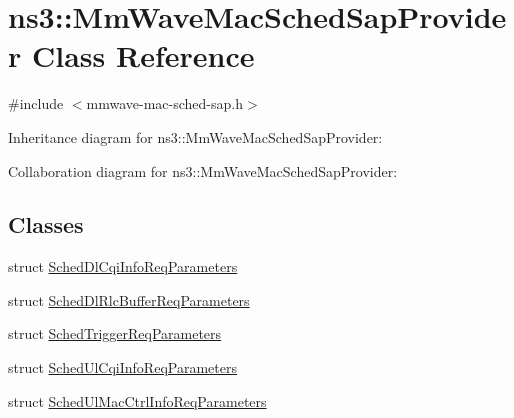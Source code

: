\hypertarget{classns3_1_1MmWaveMacSchedSapProvider}{}\section{ns3\+:\+:Mm\+Wave\+Mac\+Sched\+Sap\+Provider Class Reference}
\label{classns3_1_1MmWaveMacSchedSapProvider}


{\ttfamily \#include $<$mmwave-\/mac-\/sched-\/sap.\+h$>$}



Inheritance diagram for ns3\+:\+:Mm\+Wave\+Mac\+Sched\+Sap\+Provider\+:


Collaboration diagram for ns3\+:\+:Mm\+Wave\+Mac\+Sched\+Sap\+Provider\+:
\subsection*{Classes}
\begin{DoxyCompactItemize}
\item 
struct \hyperlink{structns3_1_1MmWaveMacSchedSapProvider_1_1SchedDlCqiInfoReqParameters}{Sched\+Dl\+Cqi\+Info\+Req\+Parameters}
\item 
struct \hyperlink{structns3_1_1MmWaveMacSchedSapProvider_1_1SchedDlRlcBufferReqParameters}{Sched\+Dl\+Rlc\+Buffer\+Req\+Parameters}
\item 
struct \hyperlink{structns3_1_1MmWaveMacSchedSapProvider_1_1SchedTriggerReqParameters}{Sched\+Trigger\+Req\+Parameters}
\item 
struct \hyperlink{structns3_1_1MmWaveMacSchedSapProvider_1_1SchedUlCqiInfoReqParameters}{Sched\+Ul\+Cqi\+Info\+Req\+Parameters}
\item 
struct \hyperlink{structns3_1_1MmWaveMacSchedSapProvider_1_1SchedUlMacCtrlInfoReqParameters}{Sched\+Ul\+Mac\+Ctrl\+Info\+Req\+Parameters}
\end{DoxyCompactItemize}
